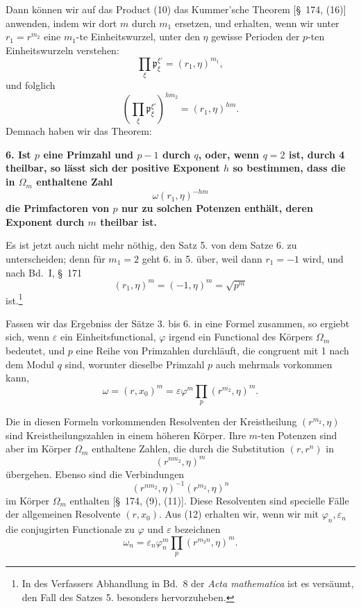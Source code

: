 \documentclass[11pt]{article}
\providecommand{\eps}{\varepsilon}
\newcommand{\pp}{\mathfrak p}
\providecommand{\eps}{\varepsilon}
\begin{document}
Dann können wir auf das Product (10) das Kummer'sche Theorem [\S~174, (16)] anwenden, indem wir dort $m$ durch $m_1$ ersetzen, und erhalten, wenn wir unter $r_1=r^{m_2}$ eine $m_1$-te Einheitswurzel, unter den $\eta$ gewisse Perioden der $p$-ten Einheitswurzeln verstehen:
\[
  \prod_\xi\pp_\xi^{\xi'}=(r_1,\eta)^{m_1},
\]
und folglich
\begin{equation}
  \left(\prod_\xi\pp_\xi^{\xi'}\right)^{hm_2}=(r_1,\eta)^{hm}.
\tag{11}
\end{equation}
Demnach haben wir das Theorem:

\textbf{6. Ist $p$ eine Primzahl und $p-1$ durch $q$, oder, wenn $q=2$ ist, durch 4 theilbar, so lässt sich der positive Exponent $h$ so bestimmen, dass die in $\Omega_m$ enthaltene Zahl}
\[
  \omega(r_1,\eta)^{-hm}
\]
\textbf{die Primfactoren von $p$ nur zu solchen Potenzen enthält, deren Exponent durch $m$ theilbar ist.}

Es ist jetzt auch nicht mehr nöthig, den Satz 5. von dem Satze 6. zu unterscheiden; denn für $m_1=2$ geht 6. in 5. über, weil dann $r_1=-1$ wird, und nach Bd.~I, \S~171
\[
  (r_1,\eta)^m=(-1,\eta)^m=\sqrt{p^m}
\]
ist.\footnote{In des Verfassers Abhandlung in Bd.~8 der \textit{Acta mathematica} ist es versäumt, den Fall des Satzes 5. besonders hervorzuheben.}

Fassen wir das Ergebniss der Sätze 3. bis 6. in eine Formel zusammen, so ergiebt sich, wenn $\eps$ ein Einheitsfunctional, $\varphi$ irgend ein Functional des Körpers $\Omega_m$ bedeutet, und $p$ eine Reihe von Primzahlen durchläuft, die congruent mit 1 nach dem Modul $q$ sind, worunter dieselbe Primzahl $p$ auch mehrmals vorkommen kann,
\begin{equation}
  \omega=(r,x_0)^m=\eps\varphi^m\prod_p(r^{m_2},\eta)^m.
\tag{12}
\end{equation}

Die in diesen Formeln vorkommenden Resolventen der Kreistheilung $(r^{m_2},\eta)$ sind Kreistheilungszahlen in einem höheren Körper. Ihre $m$-ten Potenzen sind aber im Körper $\Omega_m$ enthaltene Zahlen, die durch die Substitution $(r,r^n)$ in
\[
  (r^{nm_2},\eta)^m
\]
übergehen. Ebenso sind die Verbindungen
\begin{equation}
  (r^{nm_2},\eta)^{-1}(r^{m_2},\eta)^n
\tag{13}
\end{equation}
im Körper $\Omega_m$ enthalten [\S~174, (9), (11)]. Diese Resolventen sind specielle Fälle der allgemeinen Resolvente $(r,x_0)$. Aus (12) erhalten wir, wenn wir mit $\varphi_n,\eps_n$ die conjugirten Functionale zu $\varphi$ und $\eps$ bezeichnen
\begin{equation}
  \omega_n=\eps_n\varphi_n^m\prod_p(r^{m_2 n},\eta)^m.
\tag{14}
\end{equation}
\end{document}
